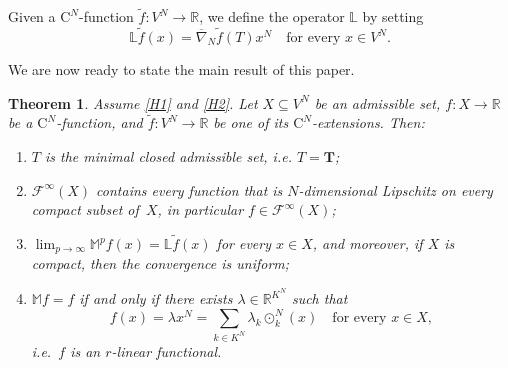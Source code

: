 \documentclass{amsart}
\theoremstyle{plain}%
\newtheorem{theorem}{Theorem}[section]
\theoremstyle{definition}
\theoremstyle{remark}
\begin{document}
Given a $\mathrm{C}^N$\nobreakdash-function $\widetilde f\colon V^N\to \mathbb{R}$, we define the operator $\mathbb L$ by setting
\begin{equation*}
\mathbb{L}\widetilde{f}(x)=\overline{\nabla}\!_N\widetilde f(T)x^N
\quad\text{for every }x\in V^N.
\end{equation*}

We are now ready to state the main result of this paper.

\begin{theorem}\label{thm:MWequatoC1}
Assume \ref{H1} and \ref{H2}.
Let $X\subseteq V^N$ be an admissible set, $f\colon X\to \mathbb{R}$ be a $\mathrm{C}^N$\nobreakdash-function, and $\widetilde f\colon V^N\to \mathbb{R}$ be one of its $\mathrm{C}^N$\nobreakdash-extensions. Then: 
\begin{enumerate}[label=$(\roman*)$]
\item\label{mainI} $T$ is the minimal closed admissible set, i.e. $T=\mathbf{T}$; 
\item\label{mainII} $\mathcal{F}^\infty(X)$ contains every function that is $N$\nobreakdash-dimensional Lipschitz on every compact subset of~$X$, in particular $f\in \mathcal{F}^\infty(X)$;
\item\label{mainIII} $\lim_{p\to\infty}\mathbb{M}^pf(x)= \mathbb{L}\widetilde{f} (x)$ for every $x\in X$, and moreover, if $X$ is compact, then the convergence is uniform;
\item\label{mainIV} $\mathbb{M}f=f$ if and only if there exists $\lambda\in\mathbb{R}^{K^N}$ such that  
\begin{equation*}
f(x)=\lambda x^N=\sum_{k\in K^N}\lambda_k\odot^N_k(x)\quad\text{for every }x\in X,
\end{equation*}
 i.e.\ $f$ is an $r$\nobreakdash-linear functional.  
\end{enumerate}
\end{theorem}
\end{document}
